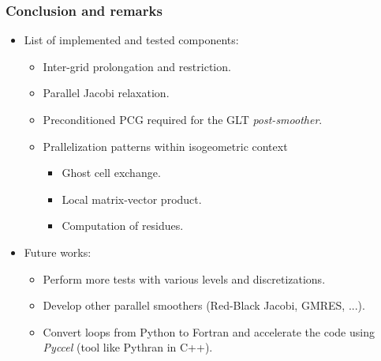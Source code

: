 \begin{frame}
\frametitle{Conclusion and remarks}
\begin{itemize}
\item List of implemented and tested components:

\begin{itemize}
\item Inter-grid prolongation and restriction.
\item Parallel Jacobi relaxation.
\item Preconditioned PCG required for the GLT \emph{post-smoother}.
\item Prallelization patterns within isogeometric context
\begin{itemize}
\item[\ding{224}] Ghost cell exchange.
\item[\ding{224}] Local matrix-vector product.
\item[\ding{224}] Computation of residues.
\end{itemize}
\end{itemize}
\end{itemize}

\begin{itemize} 
\item Future works: 
\begin{itemize}
\item Perform more tests with various levels and discretizations.
\item Develop other parallel smoothers (Red-Black Jacobi, GMRES, ...).
\item Convert loops from Python to Fortran and accelerate the code using \emph{Pyccel} (tool like Pythran in {\small C++}).
\end{itemize}
\end{itemize}

\end{frame}


